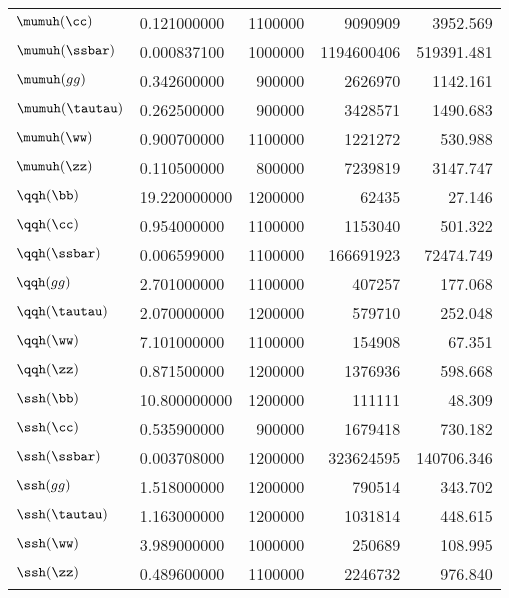 \begin{table}[!htbp]
\begin{tabular}{llrrr}
$\mumuh (\cc)$       &     0.121000000 &         1100000 &         9090909 &        3952.569 \\
$\mumuh (\ssbar)$    &     0.000837100 &         1000000 &      1194600406 &      519391.481 \\
$\mumuh (gg)$        &     0.342600000 &          900000 &         2626970 &        1142.161 \\
$\mumuh (\tautau)$   &     0.262500000 &          900000 &         3428571 &        1490.683 \\
$\mumuh (\ww)$       &     0.900700000 &         1100000 &         1221272 &         530.988 \\
$\mumuh (\zz)$       &     0.110500000 &          800000 &         7239819 &        3147.747 \\
$\qqh (\bb)$         &    19.220000000 &         1200000 &           62435 &          27.146 \\
$\qqh (\cc)$         &     0.954000000 &         1100000 &         1153040 &         501.322 \\
$\qqh (\ssbar)$      &     0.006599000 &         1100000 &       166691923 &       72474.749 \\
$\qqh (gg)$          &     2.701000000 &         1100000 &          407257 &         177.068 \\
$\qqh (\tautau)$     &     2.070000000 &         1200000 &          579710 &         252.048 \\
$\qqh (\ww)$         &     7.101000000 &         1100000 &          154908 &          67.351 \\
$\qqh (\zz)$         &     0.871500000 &         1200000 &         1376936 &         598.668 \\
$\ssh (\bb)$         &    10.800000000 &         1200000 &          111111 &          48.309 \\
$\ssh (\cc)$         &     0.535900000 &          900000 &         1679418 &         730.182 \\
$\ssh (\ssbar)$      &     0.003708000 &         1200000 &       323624595 &      140706.346 \\
$\ssh (gg)$          &     1.518000000 &         1200000 &          790514 &         343.702 \\
$\ssh (\tautau)$     &     1.163000000 &         1200000 &         1031814 &         448.615 \\
$\ssh (\ww)$         &     3.989000000 &         1000000 &          250689 &         108.995 \\
$\ssh (\zz)$         &     0.489600000 &         1100000 &         2246732 &         976.840 \\

\end{tabular}
\end{table}
